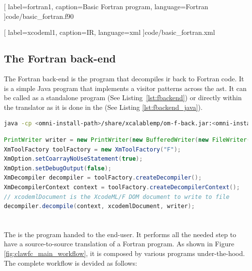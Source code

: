 
  [
    label=fortran1,
    caption=Basic Fortran program,
    language=Fortran
  ]{code/basic_fortran.f90}


  [
    label=xcodeml1,
    caption=\xcodemlf IR,
    language=xml
  ]{code/basic_fortran.xml}

\subsection{The Fortran back-end}
The Fortran back-end is the program that decompiles \gls{ir} back to Fortran
code. It is a simple Java program that implements a visitor patterns across
the \gls{ast}. It can be called as a standalone program 
(See Listing~\ref{lst:fbackend}) or directly within the translator as it is 
done in the \clawfcomp (See Listing \ref{lst:fbackend_java}).

\begin{lstlisting}[label=lst:fbackend, language=Bash, caption=Execute the 
  Fortran back-end as a standalone]
java -cp <omni-install-path>/share/xcalablemp/om-f-back.jar:<omni-install-path>/share/xcalablemp/om-exc-tools.jar xcodeml.f.util.omx2f -l xcodeml.xml
\end{lstlisting}

\begin{lstlisting}[label=lst:fbackend_java, language=Java, 
  caption=Fortran back-end called from Java]
PrintWriter writer = new PrintWriter(new BufferedWriter(new FileWriter(outputFile)));
XmToolFactory toolFactory = new XmToolFactory("F");
XmOption.setCoarrayNoUseStatement(true);
XmOption.setDebugOutput(false);
XmDecompiler decompiler = toolFactory.createDecompiler();
XmDecompilerContext context = toolFactory.createDecompilerContext();
// xcodemlDocument is the XcodeML/F DOM document to write to file
decompiler.decompile(context, xcodemlDocument, writer); 
\end{lstlisting}

\section{\clawfcomp}
The \clawfc is the program handed to the end-user. It performs all the needed
step to have a source-to-source translation of a Fortran program. As shown in
Figure \ref{fig:clawfc_main_workflow}, it is composed by various programs
under-the-hood. The complete workflow is devided as follows:

